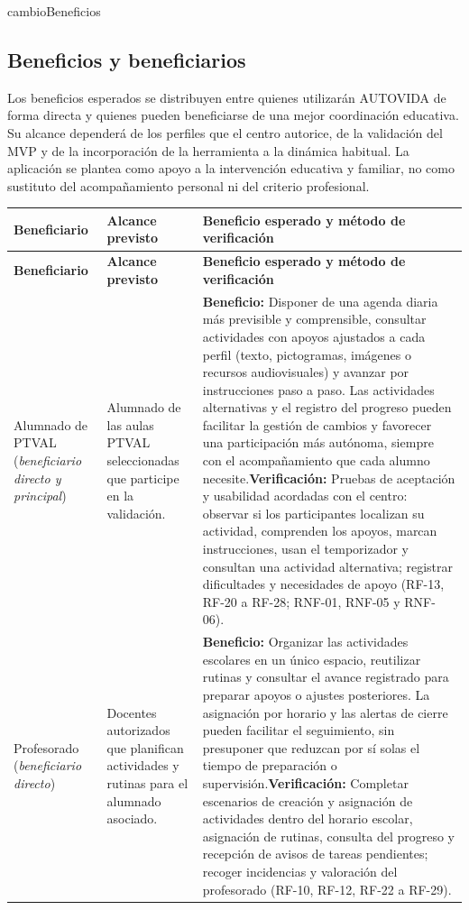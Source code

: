 \begin{cambiocontenido}{cambioBeneficios}
\subsection{Beneficios y beneficiarios}
Los beneficios esperados se distribuyen entre quienes utilizarán AUTOVIDA de forma directa y quienes pueden beneficiarse de una mejor coordinación educativa. Su alcance dependerá de los perfiles que el centro autorice, de la validación del MVP y de la incorporación de la herramienta a la dinámica habitual. La aplicación se plantea como apoyo a la intervención educativa y familiar, no como sustituto del acompañamiento personal ni del criterio profesional.

\begin{small}
\begin{longtable}{|>{\raggedright\arraybackslash}p{3.2cm}|>{\raggedright\arraybackslash}p{2.4cm}|>{\raggedright\arraybackslash}p{9.6cm}|}
\hline
\rowcolor{tableHeader}
\textbf{Beneficiario} & \textbf{Alcance previsto} & \textbf{Beneficio esperado y método de verificación} \\
\hline
\endfirsthead
\hline
\rowcolor{tableHeader}
\textbf{Beneficiario} & \textbf{Alcance previsto} & \textbf{Beneficio esperado y método de verificación} \\
\hline
\endhead
Alumnado de PTVAL (\textit{beneficiario directo y principal}) & Alumnado de las aulas PTVAL seleccionadas que participe en la validación. & \textbf{Beneficio:} Disponer de una agenda diaria más previsible y comprensible, consultar actividades con apoyos ajustados a cada perfil (texto, pictogramas, imágenes o recursos audiovisuales) y avanzar por instrucciones paso a paso. Las actividades alternativas y el registro del progreso pueden facilitar la gestión de cambios y favorecer una participación más autónoma, siempre con el acompañamiento que cada alumno necesite.\newline \textbf{Verificación:} Pruebas de aceptación y usabilidad acordadas con el centro: observar si los participantes localizan su actividad, comprenden los apoyos, marcan instrucciones, usan el temporizador y consultan una actividad alternativa; registrar dificultades y necesidades de apoyo (RF-13, RF-20 a RF-28; RNF-01, RNF-05 y RNF-06). \\
\hline
Profesorado (\textit{beneficiario directo}) & Docentes autorizados que planifican actividades y rutinas para el alumnado asociado. & \textbf{Beneficio:} Organizar las actividades escolares en un único espacio, reutilizar rutinas y consultar el avance registrado para preparar apoyos o ajustes posteriores. La asignación por horario y las alertas de cierre pueden facilitar el seguimiento, sin presuponer que reduzcan por sí solas el tiempo de preparación o supervisión.\newline \textbf{Verificación:} Completar escenarios de creación y asignación de actividades dentro del horario escolar, asignación de rutinas, consulta del progreso y recepción de avisos de tareas pendientes; recoger incidencias y valoración del profesorado (RF-10, RF-12, RF-22 a RF-29). \\

\end{longtable}
\end{small}
\end{cambiocontenido}
